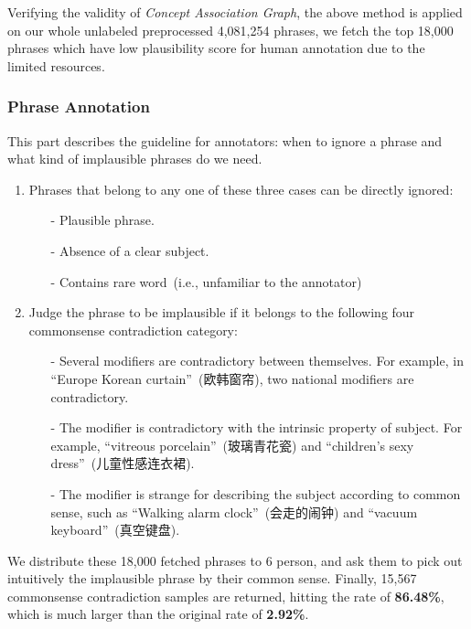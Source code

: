 Verifying the validity of \textit{Concept Association Graph}, the above method is applied on 
our whole unlabeled preprocessed 4,081,254 phrases,
we fetch the top 18,000 phrases which have low plausibility score for human annotation due to the 
limited resources.

\subsubsection{Phrase Annotation}

This part describes the guideline for annotators: when to ignore a phrase and what kind of implausible phrases do we need.
\begin{enumerate}
	\item Phrases that belong to any one of these three cases can be directly ignored: 
	\begin{itemize}
		\item [-] Plausible phrase.
		\item [-] Absence of a clear subject.
		\item [-] Contains rare word~(i.e., unfamiliar to the annotator)
	\end{itemize}
	\item Judge the phrase to be implausible if it belongs to the following four commonsense contradiction category:
	\begin{itemize}
		\item [-] Several modifiers are contradictory between themselves. %
		For example, in ``Europe Korean curtain''~(欧韩窗帘), two national modifiers are contradictory.
		
		\item [-] The modifier is contradictory with the intrinsic property of subject. For example, ``vitreous porcelain''~(玻璃青花瓷) and ``children's sexy dress''~(儿童性感连衣裙).%
		
		\item [-] The modifier is strange for describing the subject %
		according to common sense, such as ``Walking alarm clock''~(会走的闹钟) and ``vacuum keyboard''~(真空键盘).
	\end{itemize}
\end{enumerate}

We distribute these 18,000 fetched phrases to 6 person,
and ask them to pick out intuitively the implausible phrase by their common sense. Finally, 15,567 commonsense contradiction samples are returned, hitting the rate of \textbf{86.48\%}, which is much larger than the original rate of \textbf{2.92\%}.

